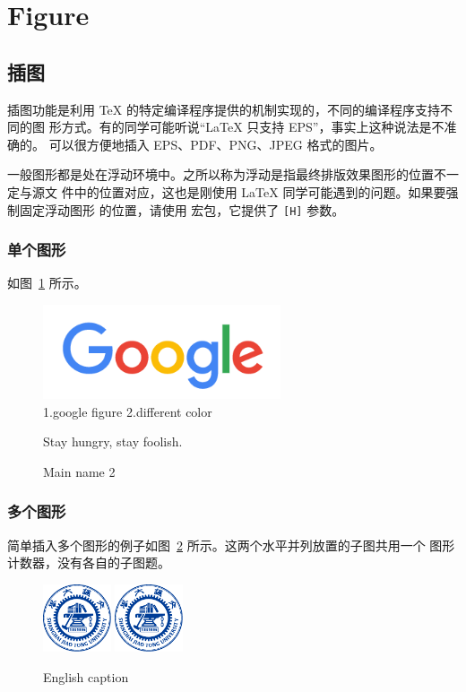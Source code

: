 
\clearpage
\section{Figure}

\subsection{插图}

插图功能是利用 \TeX{} 的特定编译程序提供的机制实现的，不同的编译程序支持不同的图
形方式。有的同学可能听说“\LaTeX{} 只支持 EPS”，事实上这种说法是不准确的。\XeTeX{}
可以很方便地插入 EPS、PDF、PNG、JPEG 格式的图片。

一般图形都是处在浮动环境中。之所以称为浮动是指最终排版效果图形的位置不一定与源文
件中的位置对应，这也是刚使用 \LaTeX{} 同学可能遇到的问题。如果要强制固定浮动图形
的位置，请使用  宏包，它提供了 \texttt{[H]} 参数。

\subsubsection{单个图形}

如图~\ref{fig.google} 所示。

\begin{figure}[ht]
    \centering
    \includegraphics[width=7cm]{./figure/google.png} \\
      1.google figure 2.different color %
    \caption{Main name 2} %
    {Stay hungry, stay foolish.}
   \label{fig.google}
\end{figure}

\subsubsection{多个图形}
简单插入多个图形的例子如图~\ref{fig:SRR} 所示。这两个水平并列放置的子图共用一个
图形计数器，没有各自的子图题。

\begin{figure}[ht]
  \centering
  \includegraphics[height=2cm]{figure/badge-blue.pdf}
  \hspace{1cm}
  \includegraphics[height=2cm]{figure/badge-blue.pdf}
  \caption{English caption}
  \label{fig:SRR}
\end{figure}

